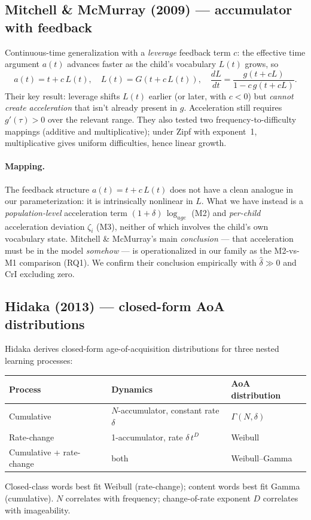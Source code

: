 \documentclass[11pt]{article}
\begin{document}
\subsection*{Mitchell \& McMurray (2009) — accumulator with feedback}

Continuous-time generalization with a \emph{leverage} feedback term
\(c\): the effective time argument \(a(t)\) advances faster as the
child's vocabulary \(L(t)\) grows, so
\[
a(t) = t + c\,L(t),
\quad L(t) = G(t + c\,L(t)),
\quad
\frac{dL}{dt} = \frac{g(t + cL)}{1 - c\,g(t+cL)}.
\]
Their key result: leverage shifts \(L(t)\) earlier (or later, with
\(c<0\)) but \emph{cannot create acceleration} that isn't already
present in \(g\). Acceleration still requires \(g'(\tau) > 0\) over
the relevant range. They also tested two frequency-to-difficulty
mappings (additive and multiplicative); under Zipf with exponent~1,
multiplicative gives uniform difficulties, hence linear growth.

\paragraph{Mapping.} The feedback structure
\(a(t) = t + c\,L(t)\) does not have a clean analogue in our
parameterization: it is intrinsically nonlinear in \(L\). What we
have instead is a \emph{population-level} acceleration term
\((1+\delta)\,\log_{age}\) (M2) and \emph{per-child} acceleration
deviation \(\zeta_i\) (M3), neither of which involves the child's
own vocabulary state. Mitchell \& McMurray's main \emph{conclusion}
— that acceleration must be in the model \emph{somehow} — is
operationalized in our family as the M2-vs-M1 comparison
(RQ1). We confirm their conclusion empirically with
\(\hat\delta \gg 0\) and CrI excluding zero.

\subsection*{Hidaka (2013) — closed-form AoA distributions}

Hidaka derives closed-form age-of-acquisition distributions for three
nested learning processes:
\begin{center}
\begin{tabular}{@{}lll@{}}
\toprule
Process & Dynamics & AoA distribution \\
\midrule
Cumulative & \(N\)-accumulator, constant rate \(\delta\) &
  \(\Gamma(N, \delta)\) \\
Rate-change & 1-accumulator, rate \(\delta\,t^D\) &
  Weibull \\
Cumulative + rate-change & both & Weibull--Gamma \\
\bottomrule
\end{tabular}
\end{center}
Closed-class words best fit Weibull (rate-change); content words best
fit Gamma (cumulative). \(N\) correlates with frequency;
change-of-rate exponent \(D\) correlates with imageability.
\end{document}

